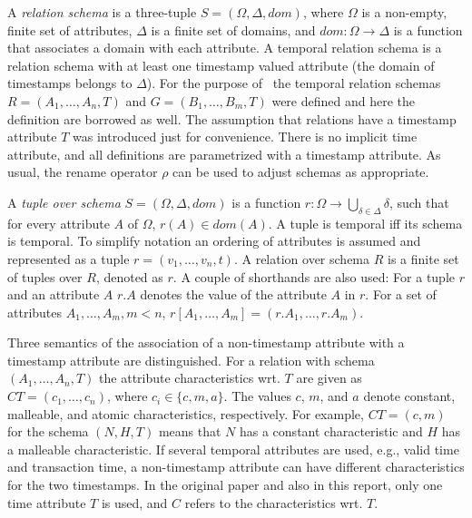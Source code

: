\documentclass[a4paper,11pt]{article}
\begin{document}
A \textit{relation schema} is a three-tuple $S = (\Omega, \Delta, dom)$, where $\Omega$ is a non-empty, finite set of attributes, $\Delta$ is a finite set of domains, and $dom: \Omega \rightarrow \Delta$ is a function that associates a domain with each attribute. A temporal relation schema is a relation schema with at least one timestamp valued attribute (the domain of timestamps belongs to $\Delta$). For the purpose of~\cite{bohlen} the temporal relation schemas $R = (A_1, \dots ,A_n,T)$ and $G = (B_1, \dots ,B_m,T)$ were defined and here the definition are borrowed as well. The assumption that relations have a timestamp attribute $T$ was introduced just for convenience. There is no implicit time attribute, and all definitions are parametrized with a timestamp attribute. As usual, the rename operator $\rho$ can be used to adjust schemas as appropriate.

A \textit{tuple over schema} $S = (\Omega, \Delta, dom)$ is a function $r: \Omega \rightarrow \bigcup_{\delta \in \Delta} \delta$, such that for every attribute $A$ of $\Omega$, $r(A) \in dom(A)$. A tuple is temporal iff its schema is temporal. To simplify notation an ordering of attributes is assumed and represented as a tuple $r = (v_1, \dots ,v_n,t)$. A relation over schema $R$ is a finite set of tuples over $R$, denoted as $r$. A couple of shorthands are also used: For a tuple $r$ and an attribute $A$ $r.A$ denotes the value of the attribute $A$ in $r$. For a set of attributes $A_1, \dots , A_m, m < n$, $r[A_1, \dots ,A_m] = (r.A_1, \dots,r.A_m)$.

Three semantics of the association of a non-timestamp attribute with a timestamp attribute are distinguished. For a relation with schema $(A_1, \dots ,A_n,T)$ the attribute characteristics wrt.	$T$ are	given as $CT=	(c_1, \dots , c_n)$, where $c_i \in \{c, m, a\}$. The values $c$, $m$, and $a$ denote constant, malleable, and atomic characteristics, respectively. For example, $CT= (c,m)$ for the schema $(N,H,T)$ means that $N$ has a constant characteristic and $H$ has a malleable characteristic. If several temporal attributes are used, e.g., valid time and transaction time, a non-timestamp attribute can have different characteristics for the two timestamps. In the original paper and also in this report, only one time attribute $T$ is used, and $C$ refers to the characteristics wrt. $T$.

\end{document}
